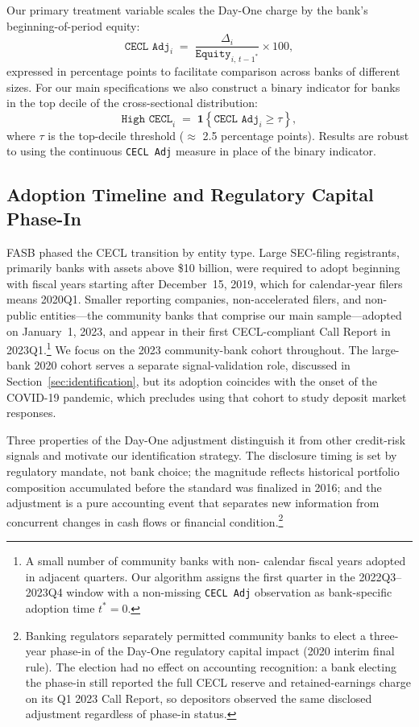 Our primary treatment variable scales the Day-One charge by the bank's
beginning-of-period equity:
\begin{equation}
  \texttt{CECL Adj}_{i}
  \;=\;
  \frac{\Delta_i}{\texttt{Equity}_{i,\,t-1^{*}}}
  \times 100,
  \label{eq:treatment}
\end{equation}
expressed in percentage points to facilitate comparison across banks of
different sizes.  For our main specifications we also construct a binary
indicator for banks in the top decile of the cross-sectional distribution:
\begin{equation}
  \texttt{High CECL}_{i}
  \;=\;
  \mathbf{1}\!\left\{
    \texttt{CECL Adj}_{i} \geq \tau
  \right\},
  \label{eq:binary}
\end{equation}
where $\tau$ is the top-decile threshold ($\approx$ 2.5 percentage points).  Results are
robust to using the continuous \texttt{CECL Adj} measure in place of the
binary indicator.

\subsection{Adoption Timeline and Regulatory Capital Phase-In}
\label{sec:background:timeline}

FASB phased the CECL transition by entity type.  Large SEC-filing registrants,
primarily banks with assets above \$10 billion, were required to adopt
beginning with fiscal years starting after December~15, 2019, which for
calendar-year filers means 2020Q1.  Smaller reporting companies, non-accelerated
filers, and non-public entities---the community banks that comprise our main
sample---adopted on January~1, 2023, and appear in their first CECL-compliant
Call Report in 2023Q1.\footnote{A small number of community banks with non-
calendar fiscal years adopted in adjacent quarters.  Our algorithm assigns the
first quarter in the 2022Q3--2023Q4 window with a non-missing
\texttt{CECL Adj} observation as bank-specific adoption time $t^{*} = 0$.}
We focus on the 2023 community-bank cohort throughout.  The large-bank 2020
cohort serves a separate signal-validation role, discussed in
Section~\ref{sec:identification}, but its adoption coincides with the onset of
the COVID-19 pandemic, which precludes using that cohort to study deposit
market responses.

\medskip\noindent
Three properties of the Day-One adjustment distinguish it from other credit-risk
signals and motivate our identification strategy.  The disclosure timing is set
by regulatory mandate, not bank choice; the magnitude reflects historical
portfolio composition accumulated before the standard was finalized in 2016; and
the adjustment is a pure accounting event that separates new information from
concurrent changes in cash flows or financial condition.\footnote{Banking
regulators separately permitted community banks to elect a three-year phase-in
of the Day-One regulatory capital impact (2020 interim final rule).  The
election had no effect on accounting recognition: a bank electing the phase-in
still reported the full CECL reserve and retained-earnings charge on its Q1 2023
Call Report, so depositors observed the same disclosed adjustment regardless of
phase-in status.}
